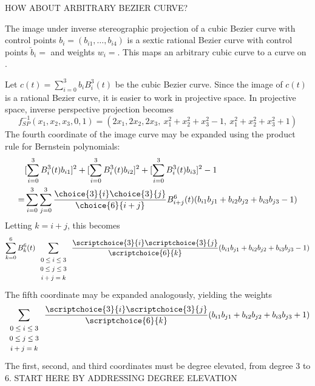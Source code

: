 \documentclass[11pt]{article}
\begin{document}
HOW ABOUT ARBITRARY BEZIER CURVE?

\begin{theorem}
\label{thm:imagesp}
The image under inverse stereographic projection 
of a cubic Bezier curve with control points $b_i = (b_{i1},\ldots,b_{i4})$
is a sextic rational Bezier curve 
with control points $\breve{b}_i = $ 
and weights $w_i = $.
This maps an arbitrary cubic curve to a curve on .
\end{theorem}
\prf
Let $c(t) = \sum_{i=0}^3 b_i B_i^3(t)$ be the cubic Bezier curve.
Since the image of $c(t)$ is a rational Bezier curve,
it is easier to work in projective space.
In projective space, inverse perspective projection becomes
\[
f^{-1}_{SP}(x_1,x_2,x_3,0,1) = (2x_1, 2x_2, 2x_3,\ x_1^2 + x_2^2 + x_3^2 - 1, 
                                \ x_1^2 + x_2^2 + x_3^2 + 1)
\]
The fourth coordinate of the image curve may be expanded using the product rule
for Bernstein polynomials:
\begin{eqnarray*}
& [\sum_{i=0}^3 B_i^3(t) b_{i1}]^2 + 
[\sum_{i=0}^3 B_i^3(t) b_{i2}]^2 + 
[\sum_{i=0}^3 B_i^3(t) b_{i3}]^2 - 1 \\
= & \sum_{i=0}^3 \sum_{j=0}^3 
	\frac{\choice{3}{i} \choice{3}{j}}{\choice{6}{i+j}}
       B^6_{i+j}(t) (b_{i1} b_{j1} + b_{i2} b_{j2} + b_{i3} b_{j3} - 1) 
\end{eqnarray*}
Letting $k=i+j$, this becomes
\[ \sum_{k=0}^6 B_k^6(t) 
	\sum_{\begin{array}{c}  \mbox{\footnotesize{$0 \leq i \leq 3$}} \\ 
	                        \mbox{\footnotesize{$0 \leq j \leq 3$}} \\ 
			        \mbox{\footnotesize{$i+j=k$}}
			     \end{array}} 
	\frac{\scriptchoice{3}{i} \scriptchoice{3}{j}}{\scriptchoice{6}{k}}
	(b_{i1} b_{j1} + b_{i2} b_{j2} + b_{i3} b_{j3} - 1) 
\]
The fifth coordinate may be expanded analogously, yielding the weights
\[
	\sum_{\begin{array}{c}  \mbox{\footnotesize{$0 \leq i \leq 3$}} \\ 
	                        \mbox{\footnotesize{$0 \leq j \leq 3$}} \\ 
			        \mbox{\footnotesize{$i+j=k$}}
			     \end{array}} 
	\frac{\scriptchoice{3}{i} \scriptchoice{3}{j}}{\scriptchoice{6}{k}}
	(b_{i1} b_{j1} + b_{i2} b_{j2} + b_{i3} b_{j3} + 1) 
\]
The first, second, and third coordinates must be degree elevated,
from degree 3 to 6.
START HERE BY ADDRESSING DEGREE ELEVATION
\QED
\end{document}
